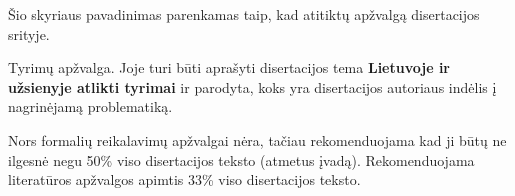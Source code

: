 Šio skyriaus pavadinimas parenkamas taip, kad atitiktų apžvalgą disertacijos srityje.

Tyrimų apžvalga. Joje turi būti aprašyti disertacijos tema \textbf{Lietuvoje ir užsienyje atlikti tyrimai} ir parodyta, koks yra disertacijos autoriaus indėlis į nagrinėjamą problematiką.

Nors formalių reikalavimų apžvalgai nėra, tačiau rekomenduojama kad ji būtų ne ilgesnė negu 50\% viso disertacijos teksto (atmetus įvadą). Rekomenduojama literatūros apžvalgos apimtis 33\% viso disertacijos teksto.


